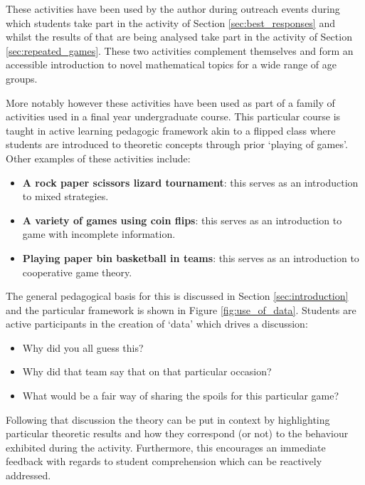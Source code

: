 \documentclass[12pt]{article}
\begin{document}
These activities have been used by the author during outreach events during
which students take part in the activity of Section \ref{sec:best_responses} and
whilst the results of that are being analysed take part in the activity of
Section \ref{sec:repeated_games}. These two activities complement themselves and
form an accessible introduction to novel mathematical topics for a wide range of
age groups.

More notably however these activities have been used as part of a family of
activities used in a final year undergraduate course. This particular course is
taught in active learning pedagogic framework akin to a flipped class where
students are introduced to theoretic concepts through prior `playing of games'.
Other examples of these activities include:

\begin{itemize}
    \item \textbf{A rock paper scissors lizard tournament}: this serves as an
        introduction to mixed strategies.
    \item \textbf{A variety of games using coin flips}: this serves as an
        introduction to game with incomplete information.
    \item \textbf{Playing paper bin basketball in teams}: this serves as an
        introduction to cooperative game theory.
\end{itemize}

The general pedagogical basis for this is discussed in Section
\ref{sec:introduction} and the particular framework is shown in Figure
\ref{fig:use_of_data}. Students are active participants in the creation of
`data' which drives a discussion:

\begin{itemize}
    \item Why did you all guess this?
    \item Why did that team say that on that particular occasion?
    \item What would be a fair way of sharing the spoils for this particular
        game?
\end{itemize}

Following that discussion the theory can be put in context by highlighting
particular theoretic results and how they correspond (or not) to the behaviour
exhibited during the activity. Furthermore, this encourages an immediate
feedback with regards to student comprehension which can be reactively
addressed.
\end{document}
